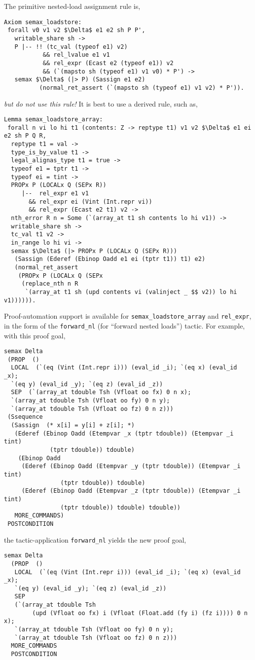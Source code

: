 \documentclass[12pt,fleqn,openany,oneside,showtrims]{memoir}
\begin{document}
\pagebreak
The primitive nested-load assignment rule is,
\begin{lstlisting}
Axiom semax_loadstore:
 forall v0 v1 v2 $\Delta$ e1 e2 sh P P',
   writable_share sh ->
   P |-- !! (tc_val (typeof e1) v2)
           && rel_lvalue e1 v1
           && rel_expr (Ecast e2 (typeof e1)) v2
           && (`(mapsto sh (typeof e1) v1 v0) * P') ->
   semax $\Delta$ (|> P) (Sassign e1 e2)
          (normal_ret_assert (`(mapsto sh (typeof e1) v1 v2) * P')).
\end{lstlisting}
\emph{but do not use this rule!}  It is best to use a derived rule,
such as,
\begin{lstlisting}
Lemma semax_loadstore_array:
 forall n vi lo hi t1 (contents: Z -> reptype t1) v1 v2 $\Delta$ e1 ei e2 sh P Q R,
  reptype t1 = val ->
  type_is_by_value t1 ->
  legal_alignas_type t1 = true ->
  typeof e1 = tptr t1 ->
  typeof ei = tint ->
  PROPx P (LOCALx Q (SEPx R))
     |--  rel_expr e1 v1
       && rel_expr ei (Vint (Int.repr vi))
       && rel_expr (Ecast e2 t1) v2 ->
  nth_error R n = Some (`(array_at t1 sh contents lo hi v1)) ->
  writable_share sh ->
  tc_val t1 v2 ->
  in_range lo hi vi ->
  semax $\Delta$ (|> PROPx P (LOCALx Q (SEPx R)))
   (Sassign (Ederef (Ebinop Oadd e1 ei (tptr t1)) t1) e2)
   (normal_ret_assert
    (PROPx P (LOCALx Q (SEPx
     (replace_nth n R
      `(array_at t1 sh (upd contents vi (valinject _ $$ v2)) lo hi v1)))))).
\end{lstlisting}

Proof-automation support
is available for \lstinline{semax_loadstore_array} and \lstinline{rel_expr},
in the form of the \lstinline{forward_nl} (for ``forward nested loads'')
tactic.  For example, with this proof goal,
\begin{lstlisting}
semax Delta
 (PROP  ()
  LOCAL  (`(eq (Vint (Int.repr i))) (eval_id _i); `(eq x) (eval_id _x);
  `(eq y) (eval_id _y); `(eq z) (eval_id _z))
  SEP  (`(array_at tdouble Tsh (Vfloat oo fx) 0 n x);
  `(array_at tdouble Tsh (Vfloat oo fy) 0 n y);
  `(array_at tdouble Tsh (Vfloat oo fz) 0 n z)))
 (Ssequence
  (Sassign  (* x[i] = y[i] + z[i]; *)
   (Ederef (Ebinop Oadd (Etempvar _x (tptr tdouble)) (Etempvar _i tint)
             (tptr tdouble)) tdouble)
    (Ebinop Oadd
     (Ederef (Ebinop Oadd (Etempvar _y (tptr tdouble)) (Etempvar _i tint)
                (tptr tdouble)) tdouble)
     (Ederef (Ebinop Oadd (Etempvar _z (tptr tdouble)) (Etempvar _i tint)
                (tptr tdouble)) tdouble) tdouble))
   MORE_COMMANDS)
 POSTCONDITION
\end{lstlisting}
the tactic-application \lstinline{forward_nl} yields the new proof goal,
\begin{lstlisting}
semax Delta
  (PROP  ()
   LOCAL  (`(eq (Vint (Int.repr i))) (eval_id _i); `(eq x) (eval_id _x);
   `(eq y) (eval_id _y); `(eq z) (eval_id _z))
   SEP
   (`(array_at tdouble Tsh
        (upd (Vfloat oo fx) i (Vfloat (Float.add (fy i) (fz i)))) 0 n x);
   `(array_at tdouble Tsh (Vfloat oo fy) 0 n y);
   `(array_at tdouble Tsh (Vfloat oo fz) 0 n z)))
  MORE_COMMANDS
  POSTCONDITION
\end{lstlisting}
\end{document}

